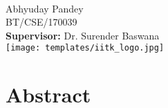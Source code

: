 \makeatletter
    \begin{titlepage}
        \begin{center}
            {\huge \bfseries  \@title }\\[4ex] 
            {\large  Abhyuday Pandey}\\[4ex]
            {\large BT/CSE/170039}\\[4ex]
            {\large \textbf{Supervisor:} Dr. Surender Baswana}\\[20ex]
            \texttt{[image: templates/iitk\_logo.jpg]}\\[20ex] 
            
            {\large \@date}
        \end{center}
    \end{titlepage}
\makeatother
\thispagestyle{empty}
\newpage



\section*{Abstract}

\vfill

\pagebreak
% 

